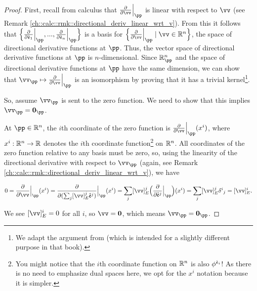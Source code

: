 \begin{proof}
    First, recall from calculus that $\frac{\pd}{\pd \vv}\Big|_\pp$ is linear with respect to $\vv$ (see Remark \ref{ch::calc::rmk::directional_deriv_linear_wrt_v}). From this it follows that $\Big\{ \frac{\pd}{\pd \see_1}\Big|_\pp, ..., \frac{\pd}{\pd \see_n}\Big|_\pp \Big\}$ is a basis for $\Big\{ \frac{\pd}{\pd \vv}\Big|_\pp \mid \vv \in \R^n \Big\}$, the space of directional derivative functions at $\pp$. Thus, the vector space of directional derivative functions at $\pp$ is $n$-dimensional. Since $\R^n_\pp$ and the space of directional derivative functions at $\pp$ have the same dimension, we can show that $\vv_\pp \mapsto \frac{\pd}{\pd \vv}\Big|_\pp$ is an isomorphism by proving that it has a trivial kernel\footnote{We adapt the argument from \cite[p. 53]{book::SM} (which is intended for a slightly different purpose in that book).}.
    
    So, assume $\vv_\pp$ is sent to the zero function. We need to show that this implies $\vv_\pp = \mathbf{0}_\pp$. 
        
    At $\pp \in \R^n$, the $i$th coordinate of the zero function is $\frac{\pd}{\pd \vv}\Big|_\pp (x^i)$, where $x^i:\mathbb{R}^n \rightarrow \mathbb{R}$ denotes the $i$th coordinate function\footnote{You might notice that the $i$th coordinate function on $\mathbb{R}^n$ is also $\phi^{\hat{\mathfrak{e}}_i}$! As there is no need to emphasize dual spaces here, we opt for the $x^i$ notation because it is simpler.} on $\mathbb{R}^n$. All coordinates of the zero function relative to any basis must be zero, so, using the linearity of the directional derivative with respect to $\vv_\pp$ (again, see Remark \ref{ch::calc::rmk::directional_deriv_linear_wrt_v}), we have
    
    \begin{align*}
        0 
        = \frac{\pd}{\pd \vv}\Big|_\pp (x^i) 
        = \frac{\pd}{\pd (\sum_j [\vv]_E^j \see^j)}\Big|_\pp (x^i) 
        = \sum_j [\vv]_E^j \Big( \frac{\pd}{\pd \see^j}\Big|_\pp \Big) (x^i)
        = \sum_j [\vv]_E^j \delta^i{}_j 
        = [\vv]_E^i.
    \end{align*}
    
    We see $[\vv]_E^i = 0$ for all $i$, so $\vv = \mathbf{0}$, which means $\vv_\pp = \mathbf{0}_\pp$.
\end{proof}

\begin{comment}
    \begin{theorem}
        (Basis for $T_\pp(\R^n)$). For any $\pp \in \R^n$, the derivations $\Big\{ \frac{\pd}{\pd x^i}\Big|_\pp \Big\}_{i = 1}^n$ at $\pp \in \R^n$, where $\Big( \frac{\pd}{\pd x^i}\Big) \Big|_\pp (f) = \frac{\pd f}{\pd x^i}\Big|_\pp$, are a basis for $T_\pp(\R^n)$.
    \end{theorem}
\end{comment}

